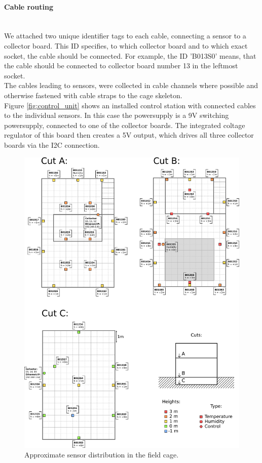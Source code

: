 \documentclass[a4paper]{scrreprt}
\begin{document}
\paragraph{Cable routing}\hspace{1cm}\\
We attached two unique identifier tags to each cable, connecting a sensor to a collector
board. This ID specifies, to which collector board and to which exact socket,
the cable should be connected. For example, the ID 'B013S0' means, that the cable should
be connected to collector board number 13 in the leftmost socket.\\
The cables leading to sensors, were collected in cable channels where possible and otherwise
fastened with cable straps to the cage skeleton.\\
Figure \ref{fig:control_unit} shows an installed control station with connected cables to
the individual sensors. In this case the powersupply is a 9V switching powersupply, connected
to one of the collector boards. The integrated coltage regulator of this board then creates
a 5V output, which drives all three collector boards via the I2C connection.
\begin{figure}
	\centering
	\includegraphics[width=\textwidth]{img/installPlan.pdf}
  \caption{Approximate sensor distribution in the field cage.}
	\label{fig:install}
\end{figure}
\end{document}
